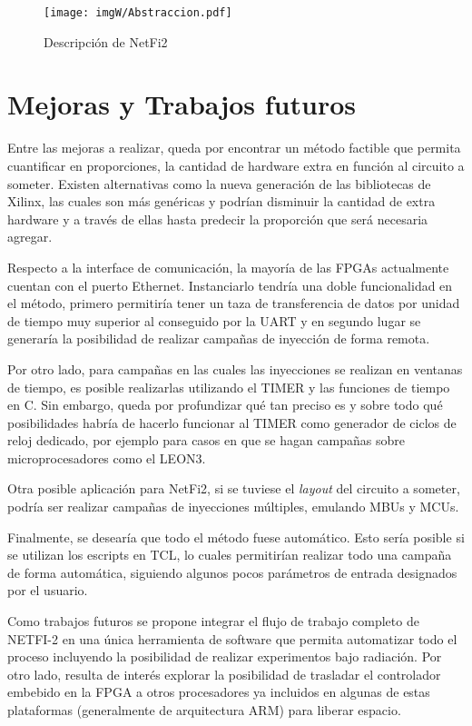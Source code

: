 \documentclass[a4paper,openright,12pt]{report}
\begin{document}
\begin{figure}[H]
	\centering
	\texttt{[image: imgW/Abstraccion.pdf]}
	\caption{Descripción de NetFi2 }
	\label{proceso3}
    \end{figure}



\section{Mejoras y Trabajos futuros }


Entre las mejoras a realizar, queda por encontrar un método factible que permita cuantificar en proporciones, la cantidad de hardware extra en función al circuito a someter.
Existen alternativas como la nueva generación de las bibliotecas de Xilinx, las cuales son más genéricas y podrían disminuir la cantidad de extra hardware y  a través de ellas hasta predecir la proporción  que será necesaria agregar.

Respecto a la interface de comunicación, la mayoría de las FPGAs actualmente cuentan con el puerto Ethernet.  Instanciarlo tendría una doble funcionalidad en el método, primero permitiría tener un taza de transferencia  de datos por unidad de tiempo muy superior al conseguido por la UART y en segundo lugar se generaría la posibilidad de realizar campañas de inyección de forma remota.

Por otro lado, para campañas en las cuales las inyecciones se realizan en ventanas de tiempo, es posible realizarlas utilizando el TIMER y las funciones de tiempo en C. Sin embargo, queda por profundizar qué tan preciso es y sobre todo qué posibilidades habría de hacerlo funcionar al TIMER como generador de ciclos de reloj dedicado, por ejemplo para  casos en que se hagan campañas sobre microprocesadores como el LEON3. 

Otra posible aplicación  para NetFi2,  si se tuviese el \textit{layout} del circuito a someter, podría ser realizar campañas de inyecciones múltiples, emulando MBUs y MCUs.


Finalmente, se desearía que todo el método fuese automático. Esto sería posible si se utilizan los escripts en TCL, lo cuales permitirían realizar todo una campaña de forma automática, siguiendo algunos pocos parámetros de entrada designados por el usuario.





Como trabajos futuros se propone integrar el flujo de trabajo completo de NETFI-2 en una única herramienta de software que permita automatizar todo el proceso incluyendo la posibilidad de realizar experimentos bajo radiación. Por otro lado, resulta de interés explorar la posibilidad de trasladar el controlador embebido en la FPGA a otros procesadores ya incluidos en algunas de estas plataformas (generalmente de arquitectura ARM) para liberar espacio.
\end{document}
